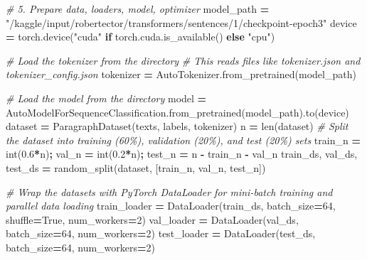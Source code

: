\documentclass[
]{article}
\newenvironment{Shaded}{\begin{snugshade}}{\end{snugshade}}
\newcommand{\BuiltInTok}[1]{#1}
\newcommand{\CommentTok}[1]{\textcolor[rgb]{0.56,0.35,0.01}{\textit{#1}}}
\newcommand{\ControlFlowTok}[1]{\textcolor[rgb]{0.13,0.29,0.53}{\textbf{#1}}}
\newcommand{\DecValTok}[1]{\textcolor[rgb]{0.00,0.00,0.81}{#1}}
\newcommand{\FloatTok}[1]{\textcolor[rgb]{0.00,0.00,0.81}{#1}}
\newcommand{\NormalTok}[1]{#1}
\newcommand{\OperatorTok}[1]{\textcolor[rgb]{0.81,0.36,0.00}{\textbf{#1}}}
\newcommand{\StringTok}[1]{\textcolor[rgb]{0.31,0.60,0.02}{#1}}
\newcommand{\VariableTok}[1]{\textcolor[rgb]{0.00,0.00,0.00}{#1}}
\begin{document}
\begin{Shaded}
\begin{Highlighting}[]
\CommentTok{\# 5. Prepare data, loaders, model, optimizer}
\NormalTok{model\_path }\OperatorTok{=} \StringTok{"/kaggle/input/robertector/transformers/sentences/1/checkpoint{-}epoch3"}
\NormalTok{device }\OperatorTok{=}\NormalTok{ torch.device(}\StringTok{"cuda"} \ControlFlowTok{if}\NormalTok{ torch.cuda.is\_available() }\ControlFlowTok{else} \StringTok{"cpu"}\NormalTok{)}

\CommentTok{\# Load the tokenizer from the directory}
\CommentTok{\# This reads files like tokenizer.json and tokenizer\_config.json}
\NormalTok{tokenizer }\OperatorTok{=}\NormalTok{ AutoTokenizer.from\_pretrained(model\_path)}

\CommentTok{\# Load the model from the directory}
\NormalTok{model }\OperatorTok{=}\NormalTok{ AutoModelForSequenceClassification.from\_pretrained(model\_path).to(device)}
\NormalTok{dataset }\OperatorTok{=}\NormalTok{ ParagraphDataset(texts, labels, tokenizer)}
\NormalTok{n }\OperatorTok{=} \BuiltInTok{len}\NormalTok{(dataset)}
\CommentTok{\# Split the dataset into training (60\%), validation (20\%), and test (20\%) sets}
\NormalTok{train\_n }\OperatorTok{=} \BuiltInTok{int}\NormalTok{(}\FloatTok{0.6}\OperatorTok{*}\NormalTok{n)}\OperatorTok{;}\NormalTok{ val\_n }\OperatorTok{=} \BuiltInTok{int}\NormalTok{(}\FloatTok{0.2}\OperatorTok{*}\NormalTok{n)}\OperatorTok{;}\NormalTok{ test\_n }\OperatorTok{=}\NormalTok{ n }\OperatorTok{{-}}\NormalTok{ train\_n }\OperatorTok{{-}}\NormalTok{ val\_n}
\NormalTok{train\_ds, val\_ds, test\_ds }\OperatorTok{=}\NormalTok{ random\_split(dataset, [train\_n, val\_n, test\_n])}

\CommentTok{\# Wrap the datasets with PyTorch DataLoader for mini{-}batch training and parallel data loading}
\NormalTok{train\_loader }\OperatorTok{=}\NormalTok{ DataLoader(train\_ds, batch\_size}\OperatorTok{=}\DecValTok{64}\NormalTok{, shuffle}\OperatorTok{=}\VariableTok{True}\NormalTok{, num\_workers}\OperatorTok{=}\DecValTok{2}\NormalTok{)}
\NormalTok{val\_loader   }\OperatorTok{=}\NormalTok{ DataLoader(val\_ds, batch\_size}\OperatorTok{=}\DecValTok{64}\NormalTok{, num\_workers}\OperatorTok{=}\DecValTok{2}\NormalTok{)}
\NormalTok{test\_loader  }\OperatorTok{=}\NormalTok{ DataLoader(test\_ds, batch\_size}\OperatorTok{=}\DecValTok{64}\NormalTok{, num\_workers}\OperatorTok{=}\DecValTok{2}\NormalTok{)}


\end{Highlighting}
\end{Shaded}
\end{document}
